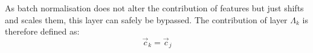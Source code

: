 As batch normalisation does not alter the contribution of features but just shifts and scales them, this layer can safely be bypassed. The contribution of layer $\Lambda_k$ is therefore defined as:
\begin{equation*}
    \vec{c}_k = \vec{c}_j
\end{equation*}



